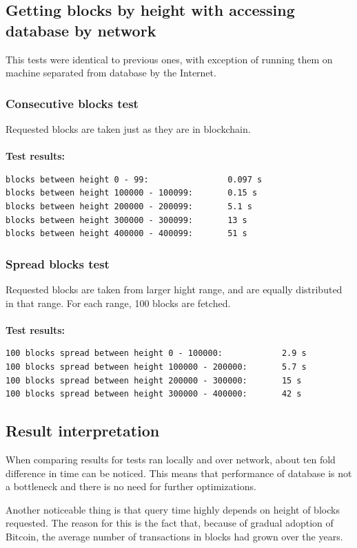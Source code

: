 \documentclass[12pt, en, eng, oneside]{mgr}
\begin{document}
\subsection{Getting blocks by height with accessing database by network}
This tests were identical to previous ones, with exception of running them on machine separated from database by the Internet.

\subsubsection{Consecutive blocks test}
Requested blocks are taken just as they are in blockchain.
\\
\\
\textbf{Test results:}
\begin{verbatim}
blocks between height 0 - 99:                0.097 s
blocks between height 100000 - 100099:       0.15 s
blocks between height 200000 - 200099:       5.1 s
blocks between height 300000 - 300099:       13 s
blocks between height 400000 - 400099:       51 s
\end{verbatim}

\subsubsection{Spread blocks test}
Requested blocks are taken from larger hight range, and are equally distributed in that range. For each range, 100 blocks are fetched.
\\
\\ 
\textbf{Test results:}
\begin{verbatim}
100 blocks spread between height 0 - 100000:            2.9 s
100 blocks spread between height 100000 - 200000:       5.7 s
100 blocks spread between height 200000 - 300000:       15 s
100 blocks spread between height 300000 - 400000:       42 s
\end{verbatim}


\subsection{Result interpretation}
When comparing results for tests ran locally and over network, about ten fold difference in time can be noticed. This means that performance of database is not a bottleneck and there is no need for further optimizations.

Another noticeable thing is that query time highly depends on height of blocks requested. The reason for this is the fact that, because of gradual adoption of Bitcoin, the average number of transactions in blocks had grown over the years. 
\end{document}
